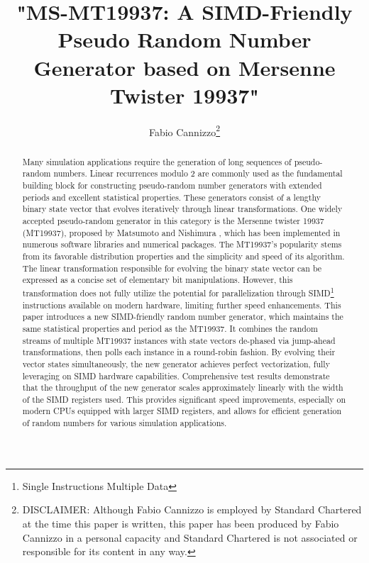 \documentclass[preprint,1p,times]{elsarticle}
\begin{document}
\newenvironment{myitemize}
{ \begin{itemize} [topsep= 3pt] %
    \setlength{\itemsep}{0pt}
    \setlength{\parskip}{0pt}
    \setlength{\parsep}{0pt}     }
{ \end{itemize}                  }

\newcommand\XOR{\mathbin{\oplus}}
\newcommand\OR{\mid}
\newcommand\AND{\&}



\begin{frontmatter}
\title{"MS-MT19937: A SIMD-Friendly Pseudo Random Number Generator based on Mersenne Twister 19937"}

\author{\renewcommand*{\thefootnote}{\fnsymbol{footnote}}
	Fabio Cannizzo\footnote{DISCLAIMER: Although Fabio Cannizzo is employed by Standard Chartered at the time this paper is written, this paper has been produced by Fabio Cannizzo in a personal capacity and Standard Chartered is not associated or responsible for its content in any way.}}

\begin{abstract}
Many simulation applications require the generation of long sequences of pseudo-random numbers. Linear recurrences modulo 2 are commonly used as the fundamental building block for constructing pseudo-random number generators with extended periods and excellent statistical properties. These generators consist of a lengthy binary state vector that evolves iteratively through linear transformations. One widely accepted pseudo-random generator in this category is the Mersenne twister 19937 (MT19937), proposed by Matsumoto and Nishimura \cite{mt19937}, which has been implemented in numerous software libraries and numerical packages. The MT19937's popularity stems from its favorable distribution properties and the simplicity and speed of its algorithm. The linear transformation responsible for evolving the binary state vector can be expressed as a concise set of elementary bit manipulations. However, this transformation does not fully utilize the potential for parallelization through SIMD\footnote{Single Instructions Multiple Data} instructions available on modern hardware, limiting further speed enhancements.
This paper introduces a new SIMD-friendly random number generator, which maintains the same statistical properties and period as the MT19937. It combines the random streams of multiple MT19937 instances with state vectors de-phased via jump-ahead transformations, then polls each instance in a round-robin fashion. By evolving their vector states simultaneously, the new generator achieves perfect vectorization, fully leveraging on SIMD hardware capabilities. Comprehensive test results demonstrate that the throughput of the new generator scales approximately linearly with the width of the SIMD registers used. This provides significant speed improvements, especially on modern CPUs equipped with larger SIMD registers, and allows for efficient generation of random numbers for various simulation applications.
\end{abstract}


\end{frontmatter}
\end{document}
